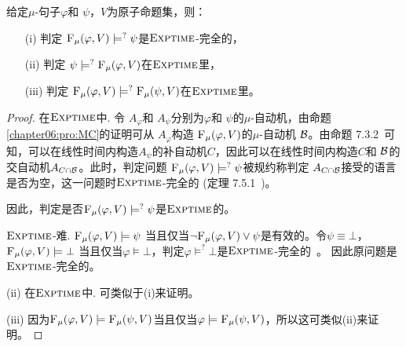 \begin{theorem}[Entailment]
	\label{thm:Ent}
	给定$\mu$-句子$\varphi$和 $\psi$，$V$为原子命题集，则：
	\begin{itemize}
		\item[(i)] 判定 ${\textsc{F}_{\textsc{$\mu$}}}(\varphi, V ) \models^? \psi$是$\textsc{Exptime}$-完全的，
		\item[(ii)] 判定 $\psi \models^? {\textsc{F}_{\textsc{$\mu$}}}(\varphi, V)$在$\textsc{Exptime}$里，
		\item[(iii)] 判定 ${\textsc{F}_{\textsc{$\mu$}}}(\varphi, V) \models^? {\textsc{F}_{\textsc{$\mu$}}}(\psi, V)$在$\textsc{Exptime}$里。
	\end{itemize}
\end{theorem}
\begin{proof}	
	在$\textsc{Exptime}$中. 令 $A_{\varphi}$和 $A_{\psi}$分别为$\varphi$和 $\psi$的$\mu$-自动机，由命题\ref{chapter06:pro:MC}的证明可从 $A_{\varphi}$构造 ${\textsc{F}_{\textsc{$\mu$}}}(\varphi, V )$的$\mu$-自动机 ${\cal B}$。由命题 7.3.2~\cite{comon1997tree}可知，可以在线性时间内构造$A_\psi$的补自动机$C$，因此可以在线性时间内构造$C$和 ${\cal B}$的交自动机$A_{C \cap {\cal B}}$。此时，判定问题 ${\textsc{F}_{\textsc{$\mu$}}}(\varphi, V ) \models^? \psi$被规约称判定 $A_{C \cap {\cal B}}$接受的语言是否为空，这一问题时$\textsc{Exptime}$-完全的 (定理 7.5.1~\cite{comon1997tree})。
	
	因此，判定是否${\textsc{F}_{\textsc{$\mu$}}}(\varphi, V ) \models^? \psi$是$\textsc{Exptime}$的。 
	
	$\textsc{Exptime}$-难. ${\textsc{F}_{\textsc{$\mu$}}}(\varphi, V ) \models \psi$ 当且仅当$\neg {\textsc{F}_{\textsc{$\mu$}}}(\varphi, V) \vee \psi$是有效的。令$\psi \equiv \bot$， ${\textsc{F}_{\textsc{$\mu$}}}(\varphi, V ) \models \bot$ 当且仅当$\varphi \models \bot$，判定$\varphi \models^? \bot$是$\textsc{Exptime}$-完全的~\cite{bradfield2018mu}。
	因此原问题是$\textsc{Exptime}$-完全的。
	
	
	(ii) 在$\textsc{Exptime}$中. 可类似于(i)来证明。 
	
%	
	(iii) 因为${\textsc{F}_{\textsc{$\mu$}}}(\varphi, V) \models {\textsc{F}_{\textsc{$\mu$}}}(\psi, V)$当且仅当$\varphi \models {\textsc{F}_{\textsc{$\mu$}}}(\psi, V)$，所以这可类似(ii)来证明。
\end{proof}

